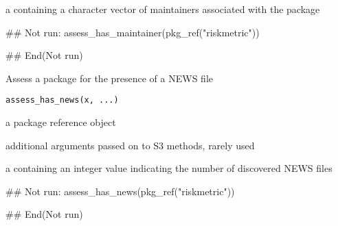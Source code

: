 \documentclass[a4paper]{book}
\begin{document}
%
\begin{Value}
a  containing a character vector of maintainers associated with the package
\end{Value}
%
\begin{SeeAlso}
\end{SeeAlso}
%
\begin{Examples}
\begin{ExampleCode}
## Not run: 
assess_has_maintainer(pkg_ref("riskmetric"))

## End(Not run)
\end{ExampleCode}
\end{Examples}
%
\begin{Description}
Assess a package for the presence of a NEWS file
\end{Description}
%
\begin{Usage}
\begin{verbatim}
assess_has_news(x, ...)
\end{verbatim}
\end{Usage}
%
\begin{Arguments}
\begin{ldescription}
\item[\code{x}] a  package reference object

\item[\code{...}] additional arguments passed on to S3 methods, rarely used
\end{ldescription}
\end{Arguments}
%
\begin{Value}
a  containing an integer value indicating the number of discovered NEWS files
\end{Value}
%
\begin{SeeAlso}
\end{SeeAlso}
%
\begin{Examples}
\begin{ExampleCode}
## Not run: 
assess_has_news(pkg_ref("riskmetric"))

## End(Not run)
\end{ExampleCode}
\end{Examples}
\end{document}
